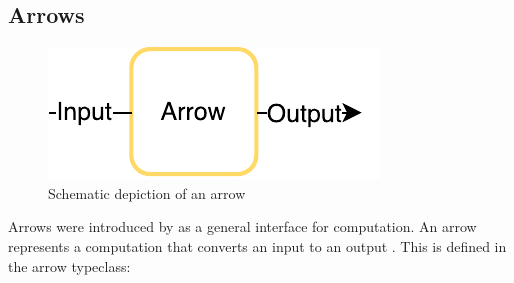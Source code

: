 \subsection{Arrows}
\label{sec:arrows}
\begin{figure}[h]
	\includegraphics{images/arrow}
	\caption{Schematic depiction of an arrow}
\end{figure}
Arrows were introduced by \citet{HughesArrows} as a general interface for computation. An arrow  represents  a computation that converts an input  to an output . This is defined in the arrow typeclass:

